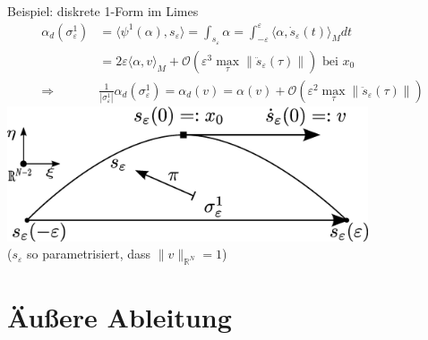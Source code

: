 \documentclass{beamer}
\newcommand{\R}{\mathds{R}}
\newcommand{\eps}{\varepsilon}
\begin{document}
  \begin{frame}
    \begin{block}{Beispiel: diskrete 1-Form im Limes}
      \begin{align*}
        \alpha_{d}(\sigma_{\eps}^{1}) &= \langle \psi^{1}(\alpha) , s_{\eps} \rangle = \int_{s_{\eps}}\alpha = \int_{-\eps}^{\eps} \langle \alpha , \dot{s}_{\eps}(t) \rangle_{M} dt \\
                                 &= 2\eps \langle \alpha , v \rangle_{M} + \mathcal{O}(\eps^{3}\max_{\tau}\|\ddot{s}_{\eps}(\tau)\|) \text{ bei } x_{0} \\
        \Rightarrow\quad  & \frac{1}{|\sigma^{1}_{\eps}|} \alpha_{d}(\sigma_{\eps}^{1}) = \alpha_{d}(v) = \alpha(v) +  \mathcal{O}(\eps^{2}\max_{\tau}\|\ddot{s}_{\eps}(\tau)\|)
      \end{align*}
      \centering\includegraphics[width=0.8\textwidth]{bilder/inkscape/EpsilonKette.eps}\\
      (\( s_{\eps} \) so parametrisiert, dass \( \|v\|_{\R^{N}} = 1 \))
    \end{block}
  \end{frame}

  

  \section{Äußere Ableitung}
\end{document}
